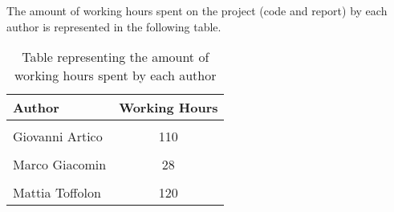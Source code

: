 \noindent
The amount of working hours spent on the project (code and report) by each author is represented in the following table.
\begin{table}[h]
    \centering
    \begin{tabular}{|l|c|}
        \hline
        \textbf{Author} & \textbf{Working Hours} \\ \hline
        \\[-1em]
        Giovanni Artico & 110 \\ \hline
        \\[-1em]
        Marco Giacomin & 28 \\ \hline
        \\[-1em]
        Mattia Toffolon & 120 \\ \hline
    \end{tabular}
    \caption{Table representing the amount of working hours spent by each author}
\end{table}
